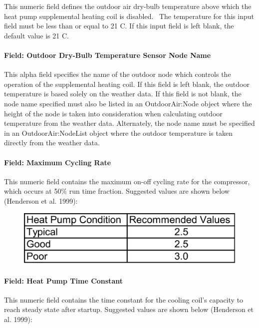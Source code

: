 This numeric field defines the outdoor air dry-bulb temperature above which the heat pump supplemental heating coil is disabled.~ The temperature for this input field must be less than or equal to 21 C. If this input field is left blank, the default value is 21 C.

\paragraph{Field: Outdoor Dry-Bulb Temperature Sensor Node Name}\label{field-outdoor-dry-bulb-temperature-sensor-node-name}

This alpha field specifies the name of the outdoor node which controls the operation of the supplemental heating coil. If this field is left blank, the outdoor temperature is based solely on the weather data. If this field is not blank, the node name specified must also be listed in an OutdoorAir:Node object where the height of the node is taken into consideration when calculating outdoor temperature from the weather data. Alternately, the node name must be specified in an OutdoorAir:NodeList object where the outdoor temperature is taken directly from the weather data.

\paragraph{Field: Maximum Cycling Rate}\label{field-maximum-cycling-rate-001}

This numeric field contains the maximum on-off cycling rate for the compressor, which occurs at 50\% run time fraction. Suggested values are shown below (Henderson et al. 1999):

\begin{figure}[htbp]
\centering
\includegraphics{media/image295.png}
\caption{}
\end{figure}

\paragraph{Field: Heat Pump Time Constant}\label{field-heat-pump-time-constant-000}

This numeric field contains the time constant for the cooling coil's capacity to reach steady state after startup. Suggested values are shown below (Henderson et al. 1999):

